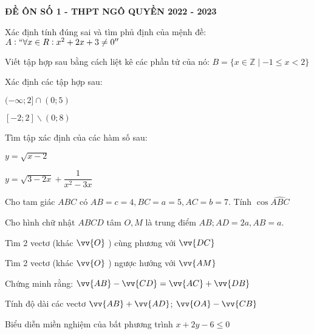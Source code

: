 \documentclass[12pt,twoside]{book}
\def\vec{\vv}
\def\overrightarrow{\vv}
\theoremstyle{definition}
\theoremstyle{nonumberplain}
\def\vec{\vv}
\def\overrightarrow{\vv}
\begin{document}
\centerline{\textbf{ĐỀ ÔN SỐ 1 - THPT NGÔ QUYỀN 2022 - 2023}}
\begin{ex}[0.75đ]
Xác định tính đúng sai và tìm phủ định của mệnh đề: $A: `` \forall x \in R: x^2+2 x+3 \neq 0''$ 
\end{ex}

\begin{ex}[0.75đ]
Viết tập hợp sau bằng cách liệt kê các phần tử của nó: $B=\{x \in \mathbb{Z} \mid -1 \leq x<2\}$
\end{ex}

\begin{ex}[0.5đ]
Xác định các tập hợp sau: 
\begin{listEX}[2]
\item $(-\infty ; 2] \cap(0 ; 5)$
\item $[-2 ; 2] \backslash(0 ; 8)$
\end{listEX} 
\end{ex}

\begin{ex}[1.5điểm]
Tìm tập xác định của các hàm số sau:
\begin{listEX}[2]
\item $y=\sqrt{x-2}$
\item $y=\sqrt{3-2 x}+\dfrac{1}{x^2-3 x}$
\end{listEX}
\end{ex}

\begin{ex}[0.5đ]
Cho tam giác $ABC$ có $A B=c=4, B C=a=5, A C=b=7$. Tính $\cos \widehat{A B C}$
\end{ex} 

\begin{ex}[2.5đ]
Cho hình chữ nhật $A B C D$ tâm $O, M$ là trung điểm $A B ; A D=2 a, A B=a$.
\begin{listEX}[2]
\item Tìm 2 vectơ (khác $\vec{O}$ ) cùng phương với $\overrightarrow{D C}$
\item Tìm 2 vectơ (khác $\vec{O}$ ) ngược hướng với $\overrightarrow{A M}$
\item Chứng minh rằng: $\overrightarrow{A B}-\overrightarrow{C D}=\overrightarrow{A C}+\overrightarrow{D B}$
\item Tính độ dài các vectơ $\overrightarrow{A B}+\overrightarrow{A D} $; $\overrightarrow{O A}-\overrightarrow{C B}$
\end{listEX}
\end{ex} 

\begin{ex}[1đ]
Biểu diễn miền nghiệm của bất phương trình $x+2 y-6 \leq 0$
\end{ex}
\end{document}
